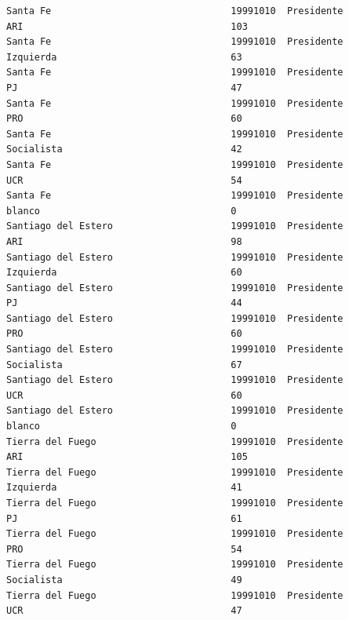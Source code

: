 \documentclass[a4paper,10pt]{article}
\begin{document}
\begin{verbatim}
Santa Fe                                19991010  Presidente                    ARI                                     103            
Santa Fe                                19991010  Presidente                    Izquierda                               63             
Santa Fe                                19991010  Presidente                    PJ                                      47             
Santa Fe                                19991010  Presidente                    PRO                                     60             
Santa Fe                                19991010  Presidente                    Socialista                              42             
Santa Fe                                19991010  Presidente                    UCR                                     54             
Santa Fe                                19991010  Presidente                    blanco                                  0              
Santiago del Estero                     19991010  Presidente                    ARI                                     98             
Santiago del Estero                     19991010  Presidente                    Izquierda                               60             
Santiago del Estero                     19991010  Presidente                    PJ                                      44             
Santiago del Estero                     19991010  Presidente                    PRO                                     60             
Santiago del Estero                     19991010  Presidente                    Socialista                              67             
Santiago del Estero                     19991010  Presidente                    UCR                                     60             
Santiago del Estero                     19991010  Presidente                    blanco                                  0              
Tierra del Fuego                        19991010  Presidente                    ARI                                     105            
Tierra del Fuego                        19991010  Presidente                    Izquierda                               41             
Tierra del Fuego                        19991010  Presidente                    PJ                                      61             
Tierra del Fuego                        19991010  Presidente                    PRO                                     54             
Tierra del Fuego                        19991010  Presidente                    Socialista                              49             
Tierra del Fuego                        19991010  Presidente                    UCR                                     47             

\end{verbatim}
\end{document}
